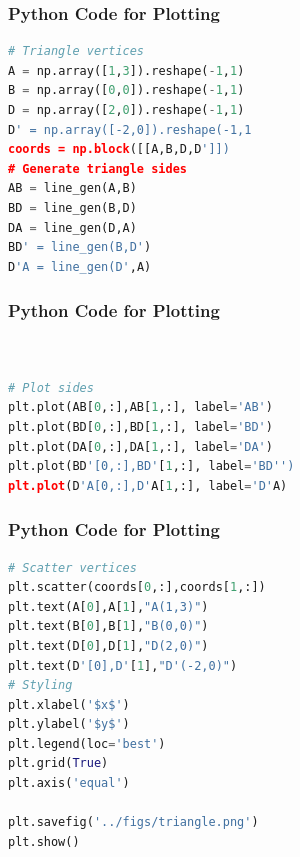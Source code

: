 \documentclass{beamer}
\theoremstyle{remark}
\numberwithin{equation}{section}
\begin{document}
\begin{frame}[fragile]
\frametitle{Python Code for Plotting}
\begin{lstlisting}[language=Python]
# Triangle vertices
A = np.array([1,3]).reshape(-1,1)
B = np.array([0,0]).reshape(-1,1)
D = np.array([2,0]).reshape(-1,1)
D' = np.array([-2,0]).reshape(-1,1
coords = np.block([[A,B,D,D']])
# Generate triangle sides
AB = line_gen(A,B)
BD = line_gen(B,D)
DA = line_gen(D,A)
BD' = line_gen(B,D')
D'A = line_gen(D',A)
\end{lstlisting}

\end{frame}
\begin{frame}[fragile]
\frametitle{Python Code for Plotting}
\begin{lstlisting}[language=Python]


# Plot sides
plt.plot(AB[0,:],AB[1,:], label='AB')
plt.plot(BD[0,:],BD[1,:], label='BD')
plt.plot(DA[0,:],DA[1,:], label='DA')
plt.plot(BD'[0,:],BD'[1,:], label='BD'')
plt.plot(D'A[0,:],D'A[1,:], label='D'A)
\end{lstlisting}

\end{frame}
\begin{frame}[fragile]
\frametitle{Python Code for Plotting}
\begin{lstlisting}[language=Python]
# Scatter vertices
plt.scatter(coords[0,:],coords[1,:])
plt.text(A[0],A[1],"A(1,3)")
plt.text(B[0],B[1],"B(0,0)")
plt.text(D[0],D[1],"D(2,0)")
plt.text(D'[0],D'[1],"D'(-2,0)")
# Styling
plt.xlabel('$x$')
plt.ylabel('$y$')
plt.legend(loc='best')
plt.grid(True)
plt.axis('equal')

plt.savefig('../figs/triangle.png')
plt.show()

\end{lstlisting}

\end{frame}
\end{document}

